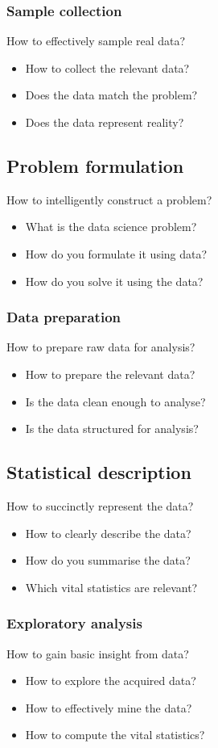 \documentclass[11pt]{article}
\begin{document}
\subsubsection{Sample collection}
\label{sec:orgb0503c9}
How to effectively sample real data?
\begin{itemize}
\item How to collect the relevant data?
\item Does the data match the problem?
\item Does the data represent reality?
\end{itemize}
\subsection{Problem formulation}
\label{sec:org74dc711}
How to intelligently construct a problem?
\begin{itemize}
\item What is the data science problem?
\item How do you formulate it using data?
\item How do you solve it using the data?
\end{itemize}
\subsubsection{Data preparation}
\label{sec:org6513711}
How to prepare raw data for analysis?
\begin{itemize}
\item How to prepare the relevant data?
\item Is the data clean enough to analyse?
\item Is the data structured for analysis?
\end{itemize}
\subsection{Statistical description}
\label{sec:org47e993c}
How to succinctly represent the data?
\begin{itemize}
\item How to clearly describe the data?
\item How do you summarise the data?
\item Which vital statistics are relevant?
\end{itemize}
\subsubsection{Exploratory analysis}
\label{sec:org95b6e42}
How to gain basic insight from data?
\begin{itemize}
\item How to explore the acquired data?
\item How to effectively mine the data?
\item How to compute the vital statistics?
\end{itemize}
\end{document}

